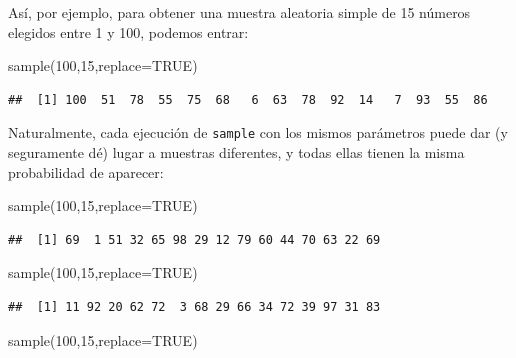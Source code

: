 \documentclass[
]{book}
\newenvironment{Shaded}{\begin{snugshade}}{\end{snugshade}}
\newcommand{\AttributeTok}[1]{\textcolor[rgb]{0.77,0.63,0.00}{#1}}
\newcommand{\ConstantTok}[1]{\textcolor[rgb]{0.00,0.00,0.00}{#1}}
\newcommand{\DecValTok}[1]{\textcolor[rgb]{0.00,0.00,0.81}{#1}}
\newcommand{\FunctionTok}[1]{\textcolor[rgb]{0.00,0.00,0.00}{#1}}
\newcommand{\NormalTok}[1]{#1}
\theoremstyle{definition}
\theoremstyle{definition}
\theoremstyle{definition}
\theoremstyle{definition}
\theoremstyle{remark}
\begin{document}
Así, por ejemplo, para obtener una muestra aleatoria simple de 15 números elegidos entre 1 y 100, podemos entrar:

\begin{Shaded}
\begin{Highlighting}[]
\FunctionTok{sample}\NormalTok{(}\DecValTok{100}\NormalTok{,}\DecValTok{15}\NormalTok{,}\AttributeTok{replace=}\ConstantTok{TRUE}\NormalTok{)}
\end{Highlighting}
\end{Shaded}

\begin{verbatim}
##  [1] 100  51  78  55  75  68   6  63  78  92  14   7  93  55  86
\end{verbatim}

Naturalmente, cada ejecución de \texttt{sample} con los mismos parámetros puede dar (y seguramente dé) lugar a muestras diferentes, y todas ellas tienen la misma probabilidad de aparecer:

\begin{Shaded}
\begin{Highlighting}[]
\FunctionTok{sample}\NormalTok{(}\DecValTok{100}\NormalTok{,}\DecValTok{15}\NormalTok{,}\AttributeTok{replace=}\ConstantTok{TRUE}\NormalTok{)}
\end{Highlighting}
\end{Shaded}

\begin{verbatim}
##  [1] 69  1 51 32 65 98 29 12 79 60 44 70 63 22 69
\end{verbatim}

\begin{Shaded}
\begin{Highlighting}[]
\FunctionTok{sample}\NormalTok{(}\DecValTok{100}\NormalTok{,}\DecValTok{15}\NormalTok{,}\AttributeTok{replace=}\ConstantTok{TRUE}\NormalTok{)}
\end{Highlighting}
\end{Shaded}

\begin{verbatim}
##  [1] 11 92 20 62 72  3 68 29 66 34 72 39 97 31 83
\end{verbatim}

\begin{Shaded}
\begin{Highlighting}[]
\FunctionTok{sample}\NormalTok{(}\DecValTok{100}\NormalTok{,}\DecValTok{15}\NormalTok{,}\AttributeTok{replace=}\ConstantTok{TRUE}\NormalTok{)}
\end{Highlighting}
\end{Shaded}
\end{document}
